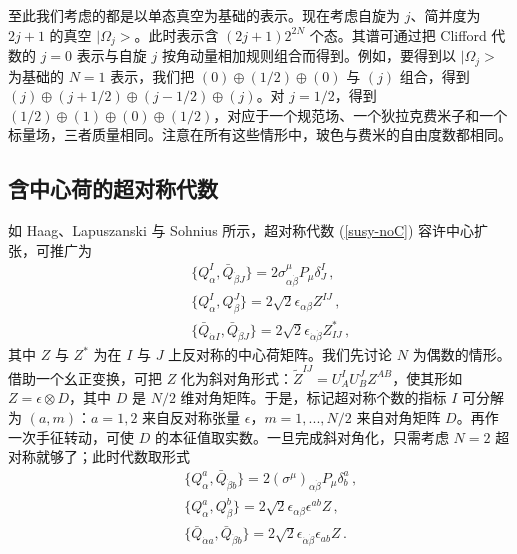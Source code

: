 
至此我们考虑的都是以单态真空为基础的表示。现在考虑自旋为 $j$、简并度为 $2j+1$ 的真空 $|\Omega_j>$。此时表示含 $(2j+1)2^{2N}$ 个态。其谱可通过把 Clifford 代数的 $j=0$ 表示与自旋 $j$ 按角动量相加规则组合而得到。例如，要得到以
$|\Omega_j>$ 为基础的 $N=1$ 表示，我们把 $(0)\oplus(1/2)\oplus (0)$ 与 $(j)$ 组合，得到 $(j)\oplus(j+1/2)\oplus(j-1/2)\oplus(j)$。对 $j=1/2$，得到
$(1/2)\oplus(1)\oplus(0)\oplus(1/2)$，对应于一个规范场、一个狄拉克费米子和一个标量场，三者质量相同。注意在所有这些情形中，玻色与费米的自由度数都相同。

\subsection{含中心荷的超对称代数}

如 Haag、Lapuszanski 与 Sohnius \cite{HLS} 所示，超对称代数 (\ref{susy-noC}) 容许中心扩张，可推广为
\begin{eqnarray}
&&\{ Q^{I}_{\alpha}, \bar{Q}_{\dot{\beta}J} \} =
2 \sigma^\mu_{\alpha \dot{\beta}} P_\mu \delta^{I}_{J}\,, 
\nonumber\\
&&\{ Q^I_\alpha, Q^J_\beta \}=2{\sqrt 2}\epsilon_{\alpha\beta} Z^{IJ}\,,
\nonumber \\
&&\{\bar{Q}_{\dot{\alpha}I},\bar{Q}_{\dot{\beta}J} \} =
2{\sqrt 2}\epsilon_{\dot{\alpha} \dot{\beta}} Z^{*}_{IJ}\,,
\label{susy-C}
\end{eqnarray}
其中 $Z$ 与 $Z^*$ 为在 $I$ 与 $J$ 上反对称的中心荷矩阵。我们先讨论 $N$ 为偶数的情形。借助一个幺正变换，可把 $Z$ 化为斜对角形式：$\tilde{Z}^{IJ} = U^{I}_{A}U^{J}_{B}Z^{AB}$，使其形如 $Z=\epsilon\otimes D$，其中 $D$ 是 $N/2$ 维对角矩阵。于是，标记超对称个数的指标 $I$ 可分解为 $(a,m)$：$a=1,2$ 来自反对称张量 $\epsilon$，$m=1,...,N/2$ 来自对角矩阵 $D$。再作一次手征转动，可使 $D$ 的本征值取实数。一旦完成斜对角化，只需考虑 $N=2$ 超对称就够了；此时代数取形式
\begin{eqnarray}
&&\{Q^a_\alpha,{\bar Q}_{\dot\beta b}\}=2(\sigma^\mu)_{\alpha\dot\beta}  
P_\mu \delta^{a}_{b}\,,\nonumber \\
&&\{ Q^a_\alpha,Q^b_\beta\}=2{\sqrt 2}\epsilon_{\alpha\beta}
\epsilon^{ab}Z\,, \nonumber \\ 
&&\{{\bar Q}_{\dot\alpha a},{\bar Q}_{\dot\beta b}\}= 
2{\sqrt 2}\epsilon_{\dot\alpha\dot\beta}\epsilon_{ab} Z \,.
\label{Susy-C'}
\end{eqnarray}

